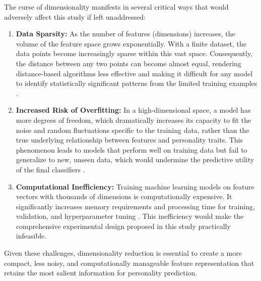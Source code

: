 The curse of dimensionality manifests in several critical ways that would adversely affect this study if left unaddressed:
\begin{enumerate}
	\item \textbf{Data Sparsity:} As the number of features (dimensions) increases, the volume of the feature space grows exponentially. With a finite dataset, the data points become increasingly sparse within this vast space. Consequently, the distance between any two points can become almost equal, rendering distance-based algorithms less effective and making it difficult for any model to identify statistically significant patterns from the limited training examples \citep{bellman1961, aggarwal2001}.
	
	\item \textbf{Increased Risk of Overfitting:} In a high-dimensional space, a model has more degrees of freedom, which dramatically increases its capacity to fit the noise and random fluctuations specific to the training data, rather than the true underlying relationship between features and personality traits. This phenomenon leads to models that perform well on training data but fail to generalize to new, unseen data, which would undermine the predictive utility of the final classifiers \citep{hastie2009}.
	
	\item \textbf{Computational Inefficiency:} Training machine learning models on feature vectors with thousands of dimensions is computationally expensive. It significantly increases memory requirements and processing time for training, validation, and hyperparameter tuning \citep{hastie2009}. This inefficiency would make the comprehensive experimental design proposed in this study practically infeasible.
\end{enumerate}
Given these challenges, dimensionality reduction is essential to create a more compact, less noisy, and computationally manageable feature representation that retains the most salient information for personality prediction.

